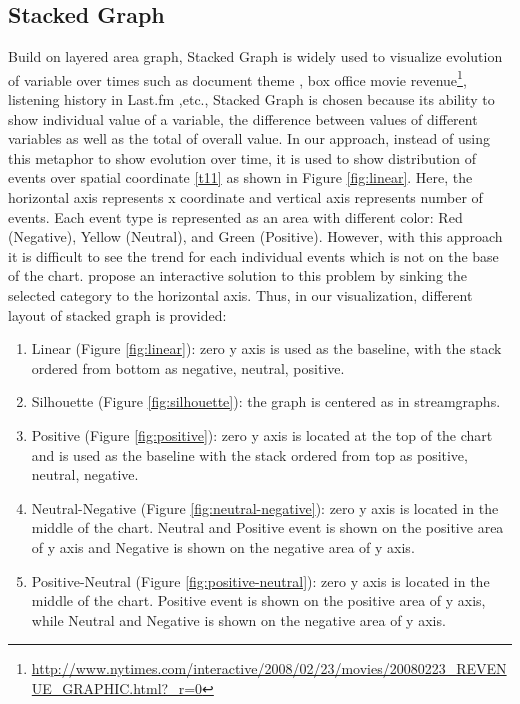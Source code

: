 \subsection{Stacked Graph}
Build on layered area graph, Stacked Graph is widely used to visualize evolution of variable over times such as document theme \cite{havre}, box office movie revenue\footnote{\url{http://www.nytimes.com/interactive/2008/02/23/movies/20080223_REVENUE_GRAPHIC.html?_r=0}}, listening history in Last.fm \cite{byron},etc., Stacked Graph is chosen because its ability to show individual value of a variable, the difference between values of different variables as well as the total of overall value. In our approach, instead of using this metaphor to show evolution over time, it is used to show distribution of events over spatial coordinate \ref{t11} as shown in Figure \ref{fig:linear}. Here, the horizontal axis represents x coordinate and vertical axis represents number of events. Each event type is represented as an area with different color: Red (Negative), Yellow (Neutral), and Green (Positive). However, with this approach it is difficult to see the trend for each individual events which is not on the base of the chart. \cite{alan} propose an interactive solution to this problem by sinking the selected category to the horizontal axis. Thus, in our visualization, different layout of stacked graph is provided: 
\begin{enumerate}
  \item Linear (Figure \ref{fig:linear}): zero y axis is used as the baseline, with the stack ordered from bottom as negative, neutral, positive.
  \item Silhouette (Figure \ref{fig:silhouette}): the graph is centered as in streamgraphs.
  \item Positive (Figure \ref{fig:positive}): zero y axis is located at the top of the chart and is used as the baseline with the stack ordered from top as positive, neutral, negative.
  \item Neutral-Negative (Figure \ref{fig:neutral-negative}): zero y axis is located in the middle of the chart. Neutral and Positive event is shown on the positive area of y axis and Negative is shown on the negative area of y axis.
  \item Positive-Neutral (Figure \ref{fig:positive-neutral}): zero y axis is located in the middle of the chart. Positive event is shown on the positive area of y axis, while Neutral and Negative is shown on the negative area of y axis.
\end{enumerate}

